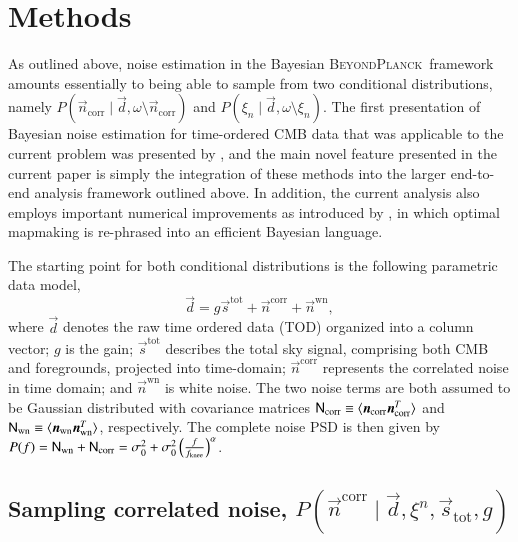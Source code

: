 \documentclass[twocolumn]{aa}
\renewcommand{\d}[0]{\vec{d}}
\newcommand{\n}[0]{\vec{n}}
\newcommand{\s}[0]{\vec{s}}
\newcommand{\BP}{\textsc{BeyondPlanck}}
\begin{document}
\section{Methods}
\label{sec:methods}

As outlined above, noise estimation in the Bayesian \BP\ framework
amounts essentially to being able to sample from two conditional
distributions, namely $P(\n_{\mathrm{corr}}\mid\d, \omega\setminus
\n_{\mathrm{corr}})$ and $P(\xi_n\mid \d, \omega\setminus\xi_n)$. The
first presentation of Bayesian noise estimation for time-ordered CMB
data that was applicable to the current problem was presented by
\citet{wehus:2012}, and the main novel feature presented in the
current paper is simply the integration of these methods into the
larger end-to-end analysis framework outlined above. In addition, the
current analysis also employs important numerical improvements as
introduced by \citet{bp02}, in which optimal mapmaking is re-phrased
into an efficient Bayesian language.

The starting point for both conditional distributions is the following
parametric data model,
\begin{equation}
 \d = g \s^{\mathrm{tot}} + \n^{\mathrm{corr}} + \n^{\mathrm{wn}},
\end{equation}
where $\d$ denotes the raw time ordered data (TOD) organized into a
column vector; $g$ is the gain; $\s^\mathrm{tot}$
describes the total sky signal, comprising both CMB and foregrounds,
projected into time-domain; $\n^\mathrm{corr}$ represents the
correlated noise in time domain; and $\n^\mathrm{wn}$ is white
noise. The two noise terms are both assumed to be Gaussian distributed
with covariance matrices $\mathsf{N}_\mathrm{corr} \equiv \langle
\boldsymbol{n}_\mathrm{corr} \boldsymbol{n}_\mathrm{corr}^{T}  \rangle$ and
$\mathsf{N}_\mathrm{wn} \equiv \langle \boldsymbol{n}_\mathrm{wn}
\boldsymbol{n}_\mathrm{wn}^{T}  \rangle$, respectively. The complete noise PSD
is then given by $P(f) = \mathsf{N}_\mathrm{wn} + \mathsf{N}_\mathrm{corr} =
\sigma_0^2 + \sigma_0^2\left(\frac{f}{f_\mathrm{knee}}\right)^\alpha$. 

\subsection{Sampling correlated noise, $P(\vec{n}^\mathrm{corr}\mid\vec{d}, \xi^n, \vec{s}_\mathrm{tot}, g)$}
\label{sec:ncorr_samp}
\end{document}
